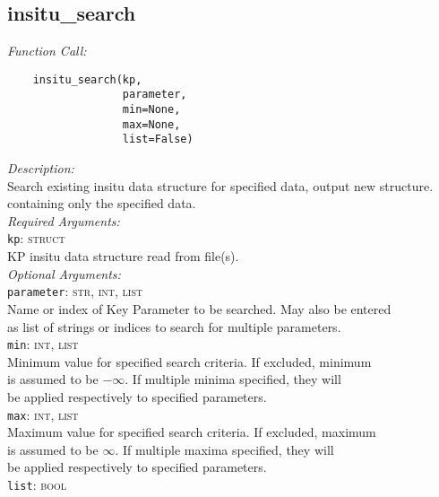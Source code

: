 \documentclass{article}
\begin{document}
\subsection{insitu\_search}
\label{subsec:insitusearch}
\vspace{-5mm}
\textit{Function Call:}\\
\vspace{-10mm}
\begin{verbatim}
    insitu_search(kp,
                  parameter,
                  min=None,
                  max=None,
                  list=False)
\end{verbatim}
\vspace{-5mm}
\noindent
\textit{Description:}\\
\indent Search existing insitu data structure for specified data, output new structure.\\
\indent containing only the specified data.\\
\noindent \textit{Required Arguments:}\\
\indent \texttt{kp}: \textsc{struct}\\
\indent \indent KP insitu data structure read from file(s).\\ 
\noindent \textit{Optional Arguments:}\\
\indent \texttt{parameter}: \textsc{str, int, list}\\
\indent \indent Name or index of Key Parameter to be searched. May also be entered\\
\indent \indent as list of strings or indices to search for multiple parameters.\\
\indent \texttt{min}: \textsc{int, list}\\
\indent \indent Minimum value for specified search criteria. If excluded, minimum\\
\indent \indent is assumed to be $-\infty$. If multiple minima specified, they will\\
\indent \indent be applied respectively to specified parameters.\\
\indent \texttt{max}: \textsc{int, list}\\
\indent \indent Maximum value for specified search criteria. If excluded, maximum\\
\indent \indent is assumed to be $\infty$. If multiple maxima specified, they will\\
\indent \indent be applied respectively to specified parameters.\\
\indent \texttt{list}: \textsc{bool}\\
\end{document}
